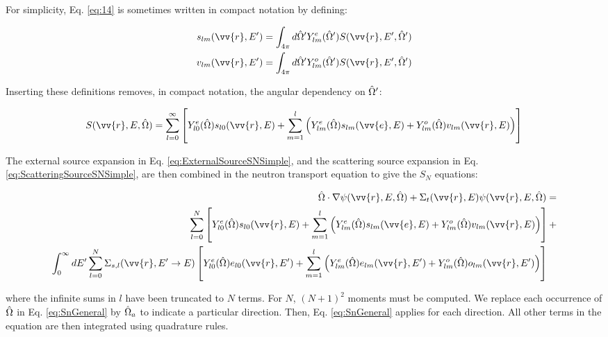 \begin{tcolorbox}[breakable]
For simplicity, Eq. \eqref{eq:14} is sometimes written in compact notation by defining:

\begin{equation}
\begin{aligned}
s_{lm}(\vv{r},E')=\int_{4\pi}^{}d\hO  'Y_{lm}^e(\hO  ')S(\vv{r}, E',\hO  ')\\
v_{lm}(\vv{r},E')=\int_{4\pi}^{}d\hO  'Y_{lm}^o(\hO  ')S(\vv{r}, E',\hO  ')\\
\end{aligned}
\end{equation}

Inserting these definitions removes, in compact notation, the angular dependency on \(\hat{\Omega}  '\):

\begin{equation}
\label{eq:ExternalSourceSNSimple}
\begin{aligned}
S(\vv{r},E, \hO  )=\sum_{l=0}^{\infty}\left\lbrack Y_{l0}^e(\hO  )s_{l0}(\vv{r},E)+\sum_{m=1}^{l}\left(Y_{lm}^e(\hO  )s_{lm}(\vv{e},E)+Y_{lm}^o(\hO  )v_{lm}(\vv{r},E)\right)\right\rbrack
\end{aligned}
\end{equation}
\end{tcolorbox}

The external source expansion in Eq. \eqref{eq:ExternalSourceSNSimple}, and the scattering source expansion in Eq. \eqref{eq:ScatteringSourceSNSimple}, are then combined in the neutron transport equation to give the \(S_N\) equations:

\begin{equation}
\label{eq:SnGeneral}
\begin{aligned}
 \hO  \cdot\nabla\psi(\vv{r}, E, \hO  ) + 
 \Sigma_t(\vv{r},E)\psi(\vv{r}, E, \hO  ) = \\
\sum_{l=0}^{N}\left\lbrack Y_{l0}^e(\hO  )s_{l0}(\vv{r},E)+\sum_{m=1}^{l}\left(Y_{lm}^e(\hO  )s_{lm}(\vv{e},E)+Y_{lm}^o(\hO  )v_{lm}(\vv{r},E)\right)\right\rbrack+\\
\int_{0}^{\infty}dE' \sum_{l=0}^{N}\Sigma_{s,l}(\vv{r}, E'\rightarrow E)\left\lbrack Y_{l0}^e(\hO  )e_{l0}(\vv{r},E')+\sum_{m=1}^{l}\left(Y_{lm}^e(\hO  )e_{lm}(\vv{r},E')+Y_{lm}^o(\hO  )o_{lm}(\vv{r},E')\right)\right\rbrack\quad\\
\end{aligned}
\end{equation}

where the infinite sums in \(l\) have been truncated to \(N\) terms. For \(N\), \((N+1)^2\) moments must be computed. 
We replace each occurrence of \(\hat{\Omega}  \) in Eq. \eqref{eq:SnGeneral} by \(\hat{\Omega}  _a\) to indicate a particular direction. Then, Eq. \eqref{eq:SnGeneral} applies for each direction. All other terms in the equation are then integrated using quadrature rules. 

